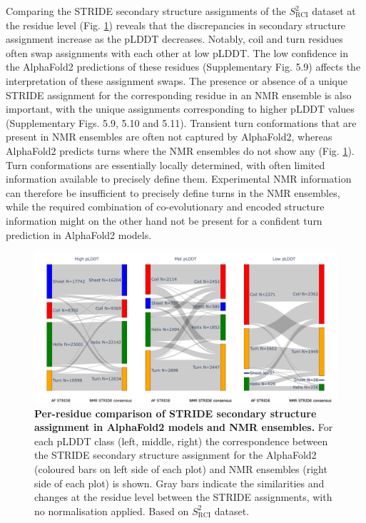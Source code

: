 Comparing the STRIDE secondary structure assignments of the $S^2_{\text{RCI}}$ dataset at the residue level (Fig. \ref{fig:sankey}) reveals that the discrepancies in secondary structure assignment increase as the pLDDT decreases. Notably, coil and turn residues often swap assignments with each other at low pLDDT. The low confidence in the AlphaFold2 predictions of these residues (Supplementary Fig. 5.9)
affects the interpretation of these assignment swaps. The presence or absence of a unique STRIDE assignment for the corresponding residue in an NMR ensemble is also important, with the unique assignments corresponding to higher pLDDT values (Supplementary Figs. 5.9, 5.10 and 5.11).
Transient turn conformations that are present in NMR ensembles are often not captured by AlphaFold2, whereas AlphaFold2 predicts turns where the NMR ensembles do not show any (Fig. \ref{fig:sankey}). Turn conformations are essentially locally determined, with often limited information available to precisely define them. Experimental NMR information can therefore be insufficient to precisely define turns in the NMR ensembles, while the required combination of co-evolutionary and encoded structure information might on the other hand not be present for a confident turn prediction in AlphaFold2 models.

\begin{figure}[ht]
    \centering
    \includegraphics[width=1\textwidth]{pLDDT/plddt_figures/sankey_ss_af_stride_af_ss_nmr_strideCons.pdf}
    \caption{\textbf{Per-residue comparison of STRIDE secondary structure assignment in AlphaFold2 models and NMR ensembles.}
    For each pLDDT class (left, middle, right) the correspondence between the STRIDE secondary structure assignment for the AlphaFold2 (coloured bars on left side of each plot) and NMR ensembles (right side of each plot) is shown. Gray bars indicate the similarities and changes at the residue level between the STRIDE assignments, with no normalisation applied.
    Based on $S^2_{\text{RCI}}$ dataset.}
    \label{fig:sankey}
\end{figure}


